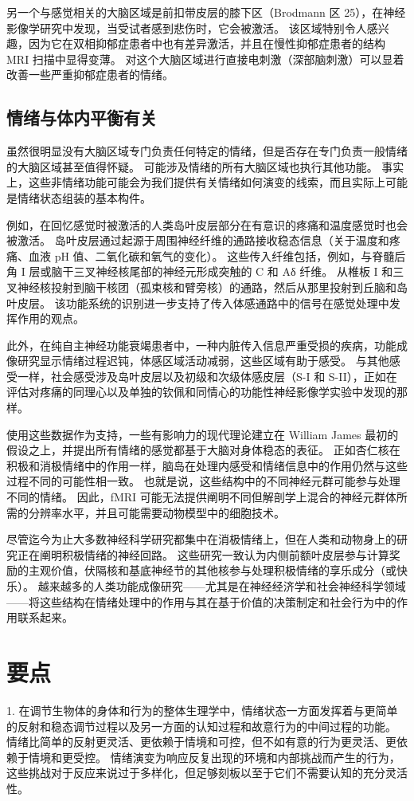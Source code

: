 另一个与感觉相关的大脑区域是前扣带皮层的膝下区（Brodmann 区 25），在神经影像学研究中发现，当受试者感到悲伤时，它会被激活。 该区域特别令人感兴趣，因为它在双相抑郁症患者中也有差异激活，并且在慢性抑郁症患者的结构 MRI 扫描中显得变薄。 对这个大脑区域进行直接电刺激（深部脑刺激）可以显着改善一些严重抑郁症患者的情绪。

\subsection{情绪与体内平衡有关}
虽然很明显没有大脑区域专门负责任何特定的情绪，但是否存在专门负责一般情绪的大脑区域甚至值得怀疑。 可能涉及情绪的所有大脑区域也执行其他功能。 事实上，这些非情绪功能可能会为我们提供有关情绪如何演变的线索，而且实际上可能是情绪状态组装的基本构件。

例如，在回忆感觉时被激活的人类岛叶皮层部分在有意识的疼痛和温度感觉时也会被激活。 岛叶皮层通过起源于周围神经纤维的通路接收稳态信息（关于温度和疼痛、血液 pH 值、二氧化碳和氧气的变化）。 这些传入纤维包括，例如，与脊髓后角 I 层或脑干三叉神经核尾部的神经元形成突触的 C 和 Aδ 纤维。 从椎板 I 和三叉神经核投射到脑干核团（孤束核和臂旁核）的通路，然后从那里投射到丘脑和岛叶皮层。 该功能系统的识别进一步支持了传入体感通路中的信号在感觉处理中发挥作用的观点。

此外，在纯自主神经功能衰竭患者中，一种内脏传入信息严重受损的疾病，功能成像研究显示情绪过程迟钝，体感区域活动减弱，这些区域有助于感受。 与其他感受一样，社会感受涉及岛叶皮层以及初级和次级体感皮层（S-I 和 S-II），正如在评估对疼痛的同理心以及单独的钦佩和同情心的功能性神经影像学实验中发现的那样。

使用这些数据作为支持，一些有影响力的现代理论建立在 William James 最初的假设之上，并提出所有情绪的感觉都基于大脑对身体稳态的表征。 正如杏仁核在积极和消极情绪中的作用一样，脑岛在处理内感受和情绪信息中的作用仍然与这些过程不同的可能性相一致。 也就是说，这些结构中的不同神经元群可能参与处理不同的情绪。 因此，fMRI 可能无法提供阐明不同但解剖学上混合的神经元群体所需的分辨率水平，并且可能需要动物模型中的细胞技术。

尽管迄今为止大多数神经科学研究都集中在消极情绪上，但在人类和动物身上的研究正在阐明积极情绪的神经回路。 这些研究一致认为内侧前额叶皮层参与计算奖励的主观价值，伏隔核和基底神经节的其他核参与处理积极情绪的享乐成分（或快乐）。 越来越多的人类功能成像研究——尤其是在神经经济学和社会神经科学领域——将这些结构在情绪处理中的作用与其在基于价值的决策制定和社会行为中的作用联系起来。


\section{要点}
1. 在调节生物体的身体和行为的整体生理学中，情绪状态一方面发挥着与更简单的反射和稳态调节过程以及另一方面的认知过程和故意行为的中间过程的功能。 情绪比简单的反射更灵活、更依赖于情境和可控，但不如有意的行为更灵活、更依赖于情境和更受控。 情绪演变为响应反复出现的环境和内部挑战而产生的行为，这些挑战对于反应来说过于多样化，但足够刻板以至于它们不需要认知的充分灵活性。 

